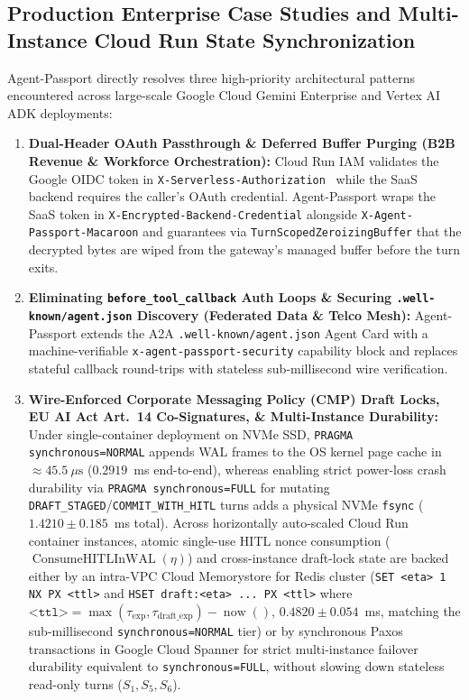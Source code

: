 \documentclass[conference,10pt]{IEEEtran}
\begin{document}
\subsection{Production Enterprise Case Studies and Multi-Instance Cloud Run State Synchronization}
Agent-Passport directly resolves three high-priority architectural patterns encountered across large-scale Google Cloud Gemini Enterprise and Vertex AI ADK deployments:
\begin{enumerate}
    \item \textbf{Dual-Header OAuth Passthrough \& Deferred Buffer Purging (B2B Revenue \& Workforce Orchestration):} Cloud Run IAM validates the Google OIDC token in \texttt{X-Serverless-Authorization}~\cite{tsao2023cloudrun} while the SaaS backend requires the caller's OAuth credential. Agent-Passport wraps the SaaS token in \texttt{X-Encrypted-Backend-Credential} alongside \texttt{X-Agent-Passport-Macaroon} and guarantees via \texttt{TurnScopedZeroizingBuffer} that the decrypted bytes are wiped from the gateway's managed buffer before the turn exits.
    \item \textbf{Eliminating \texttt{before\_tool\_callback} Auth Loops \& Securing \texttt{.well-known/agent.json} Discovery (Federated Data \& Telco Mesh):} Agent-Passport extends the A2A \texttt{.well-known/agent.json} Agent Card with a machine-verifiable \texttt{x-agent-passport-security} capability block and replaces stateful callback round-trips with stateless sub-millisecond wire verification.
    \item \textbf{Wire-Enforced Corporate Messaging Policy (CMP) Draft Locks, EU AI Act Art.~14 Co-Signatures, \& Multi-Instance Durability:} Under single-container deployment on NVMe SSD, \texttt{PRAGMA synchronous=NORMAL} appends WAL frames to the OS kernel page cache in $\approx 45.5~\mu\text{s}$ ($0.2919$~ms end-to-end), whereas enabling strict power-loss crash durability via \texttt{PRAGMA synchronous=FULL} for mutating \texttt{DRAFT\_STAGED}/\texttt{COMMIT\_WITH\_HITL} turns adds a physical NVMe \texttt{fsync} ($1.4210 \pm 0.185$~ms total). Across horizontally auto-scaled Cloud Run container instances, atomic single-use HITL nonce consumption ($\operatorname{ConsumeHITLInWAL}(\eta)$) and cross-instance draft-lock state are backed either by an intra-VPC Cloud Memorystore for Redis cluster (\texttt{SET <eta> 1 NX PX <ttl>} and \texttt{HSET draft:<eta> ... PX <ttl>} where $\texttt{<ttl>} = \max(\tau_{\exp}, \tau_{\text{draft\_exp}}) - \operatorname{now}()$, $0.4820 \pm 0.054$~ms, matching the sub-millisecond \texttt{synchronous=NORMAL} tier) or by synchronous Paxos transactions in Google Cloud Spanner for strict multi-instance failover durability equivalent to \texttt{synchronous=FULL}, without slowing down stateless read-only turns ($S_1, S_5, S_6$).
\end{enumerate}
\end{document}
